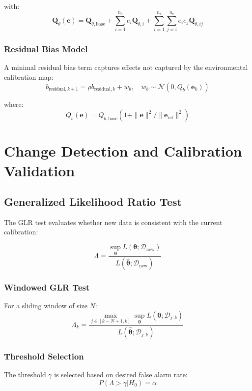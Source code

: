 \documentclass[11pt]{article}
\begin{document}
with:
\begin{equation}
\mathbf{Q}_{\theta}(\mathbf{e}) = \mathbf{Q}_{\theta,\text{base}} + \sum_{i=1}^{n_e} e_i \mathbf{Q}_{\theta,i} + \sum_{i=1}^{n_e} \sum_{j=i}^{n_e} e_i e_j \mathbf{Q}_{\theta,ij}
\end{equation}

\subsubsection{Residual Bias Model}
A minimal residual bias term captures effects not captured by the environmental calibration map:
\begin{equation}
b_{\text{residual},k+1} = \rho b_{\text{residual},k} + w_b, \quad w_b \sim \mathcal{N}(0, Q_b(\mathbf{e}_k))
\end{equation}

where:
\begin{equation}
Q_b(\mathbf{e}) = Q_{b,\text{base}} \left(1 + \|\mathbf{e}\|^2 / \|\mathbf{e}_{\text{ref}}\|^2\right)
\end{equation}

\section{Change Detection and Calibration Validation}

\subsection{Generalized Likelihood Ratio Test}

The GLR test evaluates whether new data is consistent with the current calibration:

\begin{equation}
\Lambda = \frac{\sup_{\bm{\theta}} L(\bm{\theta}; \mathcal{D}_{\text{new}})}{L(\hat{\bm{\theta}}; \mathcal{D}_{\text{new}})}
\end{equation}

\subsubsection{Windowed GLR Test}
For a sliding window of size $N$:
\begin{equation}
\Lambda_k = \frac{\max_{j \in [k-N+1,k]} \sup_{\bm{\theta}} L(\bm{\theta}; \mathcal{D}_{j:k})}{L(\hat{\bm{\theta}}; \mathcal{D}_{j:k})}
\end{equation}

\subsubsection{Threshold Selection}
The threshold $\gamma$ is selected based on desired false alarm rate:
\begin{equation}
P(\Lambda > \gamma | H_0) = \alpha
\end{equation}
\end{document}
